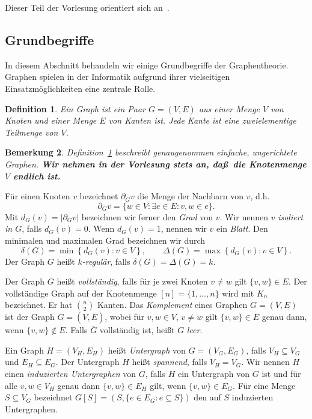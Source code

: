 \documentclass[10pt,reqno]{amsart}
\numberwithin{equation}{section}
\renewcommand\subset{\subseteq}
\newtheorem{definition}{Definition}[section]
\newtheorem{remark}[definition]{Bemerkung}
\newcommand\cbc[1]{\left\{{#1}\right\}}
\begin{document}
\noindent
Dieser Teil der Vorlesung orientiert sich an~\cite{Cormen,Diestel}.

\subsection{Grundbegriffe}
In diesem Abschnitt behandeln wir einige Grundbegriffe der Graphentheorie.
Graphen spielen in der Informatik aufgrund ihrer vielseitigen Einsatzm\"oglichkeiten eine zentrale Rolle.

\begin{definition}\label{def_graph}
Ein \emph{Graph} ist ein Paar $G=(V,E)$ aus einer Menge $V$ von Knoten und einer Menge $E$ von Kanten ist.
Jede Kante ist eine zweielementige Teilmenge von $V$.
\end{definition}

\begin{remark}\label{rem_graph}
	Definition~\ref{def_graph} beschreibt genaugenommen {\em einfache, ungerichtete} Graphen.
	{\bf\em Wir nehmen in der Vorlesung stets an, da\ss\ die Knotenmenge $V$ endlich ist.}
\end{remark}

F\"ur einen Knoten $v$ bezeichnet $\partial_Gv$ die Menge der Nachbarn von $v$, d.h.\ 
	$$\partial_Gv=\{w\in V:\exists e\in E:v,w\in e\}.$$
Mit $d_G(v)=|\partial_Gv|$ bezeichnen wir ferner den {\em Grad} von $v$.
Wir nennen $v$ {\em isoliert in $G$}, falls $d_G(v)=0$.
Wenn $d_G(v)=1$, nennen wir $v$ ein {\em Blatt}.
Den minimalen und maximalen Grad bezeichnen wir durch
	$$\delta(G)=\min\cbc{d_G(v):v\in V},\qquad\Delta(G)=\max\cbc{d_G(v):v\in V}.$$
Der Graph $G$ hei\ss t {\em $k$-regul\"ar}, falls $\delta(G)=\Delta(G)=k$.

Der Graph $G$ hei\ss t {\em vollst\"andig}, falls f\"ur je zwei Knoten $v\neq w$ gilt $\{v,w\}\in E$.
Der vollst\"andige Graph auf der Knotenmenge $[n]=\{1,\ldots,n\}$ wird mit $K_n$ bezeichnet.
Er hat $ n\choose 2$ Kanten.
Das {\em Komplement} eines Graphen $G=(V,E)$ ist der Graph $\bar G=(V,\bar E)$, wobei f\"ur $v,w\in V$, $v\neq w$ gilt $\{v,w\}\in\bar E$ genau dann, wenn
$\{v,w\}\not\in E$.
Falls $\bar G$ vollst\"andig ist, hei\ss t $G$ {\em leer}.

Ein Graph $H=(V_H,E_H)$ hei\ss t {\em Untergraph} von $G=(V_G,E_G)$, falls $V_H\subset V_G$ und $E_H\subset E_G$.
Der Untergraph $H$ hei\ss t {\em spannend}, falls $V_H=V_G$.
Wir nennen $H$ einen {\em induzierten Untergraphen} von $G$, falls
	$H$ ein Untergraph von $G$ ist und f\"ur alle $v,w\in V_H$ genau dann $\{v,w\}\in E_H$ gilt, wenn $\{v,w\}\in E_G$.
F\"ur eine Menge $S\subset V_G$ bezeichnet $G[S]=(S,\{e\in E_G:e\subset S\})$ den auf $S$ induzierten Untergraphen.
\end{document}
